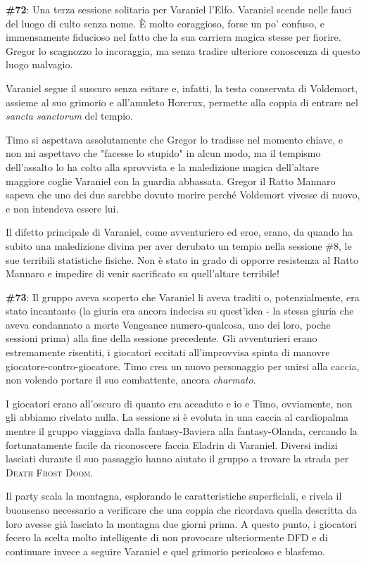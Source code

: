 \textbf{\#72}: Una terza sessione solitaria per Varaniel l'Elfo. Varaniel scende nelle fauci del luogo di culto senza nome. È molto coraggioso, forse un po' confuso, e immensamente fiducioso nel fatto che la sua carriera magica stesse per fiorire. Gregor lo scagnozzo lo incoraggia, ma senza tradire ulteriore conoscenza di questo luogo malvagio.

Varaniel segue il sussuro senza esitare e, infatti, la testa conservata di Voldemort, assieme al suo grimorio e all'amuleto Horcrux, permette alla coppia di entrare nel \textit{sancta sanctorum} del tempio.

Timo si aspettava assolutamente che Gregor lo tradisse nel momento chiave, e non mi aspettavo che "facesse lo stupido" in alcun modo, ma il tempismo dell'assalto lo ha colto alla sprovvista e la maledizione magica dell'altare maggiore coglie Varaniel con la guardia abbassata. Gregor il Ratto Mannaro sapeva che uno dei due sarebbe dovuto morire perché Voldemort vivesse di nuovo, e non intendeva essere lui.

Il difetto principale di Varaniel, come avventuriero ed eroe, erano, da quando ha subito una maledizione divina per aver derubato un tempio nella sessione \#8, le sue terribili statistiche fisiche. Non è stato in grado di opporre resistenza al Ratto Mannaro e impedire di venir sacrificato su quell'altare terribile!

\textbf{\#73}: Il gruppo aveva scoperto che Varaniel li aveva traditi o, potenzialmente, era stato incantanto (la giuria era ancora indecisa su quest'idea - la stessa giuria che aveva condannato a morte Vengeance numero-qualcosa, uno dei loro, poche sessioni prima) alla fine della sessione precedente. Gli avventurieri erano estremamente risentiti, i giocatori eccitati all'improvvisa spinta di manovre giocatore-contro-giocatore. Timo crea un nuovo personaggio per unirsi alla caccia, non volendo portare il suo combattente, ancora \textit{charmato}.

I giocatori erano all'oscuro di quanto era accaduto e io e Timo, ovviamente, non gli abbiamo rivelato nulla. La sessione si è evoluta in una caccia al cardiopalma mentre il gruppo viaggiava dalla fantasy-Baviera alla fantasy-Olanda, cercando la fortunatamente facile da riconoscere faccia Eladrin di Varaniel. Diversi indizi lasciati durante il suo passaggio hanno aiutato il gruppo a trovare la strada per \textsc{Death Frost Doom}.

Il party scala la montagna, esplorando le caratteristiche superficiali, e rivela il buonsenso necessario a verificare che una coppia che ricordava quella descritta da loro avesse già lasciato la montagna due giorni prima. A questo punto, i giocatori fecero la scelta molto intelligente di non provocare ulteriormente \textsc{DFD} e di continuare invece a seguire Varaniel e quel grimorio pericoloso e blasfemo.

